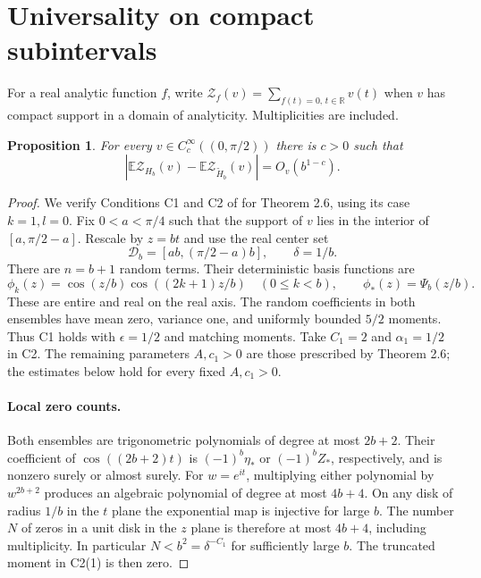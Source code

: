 \documentclass[11pt]{article}
\newtheorem{proposition}[theorem]{Proposition}
\newcommand{\E}{\mathbb E}
\newcommand{\R}{\mathbb R}
\begin{document}
\section{Universality on compact subintervals}
For a real analytic function $f$, write
$\mathcal Z_f(v)=\sum_{f(t)=0,\,t\in\R}v(t)$ when $v$ has compact
support in a domain of analyticity. Multiplicities are included.

\begin{proposition}\label{prop:universality}
For every $v\in C_c^\infty((0,\pi/2))$ there is $c>0$ such that
\begin{equation}\label{eq:univ}
 \left|\E\mathcal Z_{H_b}(v)-\E\mathcal Z_{\widetilde H_b}(v)\right|
 =O_v(b^{1-c}).
\end{equation}
\end{proposition}
\begin{proof}
We verify Conditions C1 and C2 of \cite{NV} for Theorem 2.6, using its
case $k=1,l=0$. Fix $0<a<\pi/4$ such that the support of $v$ lies in
the interior of $[a,\pi/2-a]$. Rescale by $z=bt$ and use the real
center set
\[
 \mathcal D_b=[ab,(\pi/2-a)b],\qquad \delta=1/b.
\]
There are $n=b+1$ random terms. Their deterministic basis functions are
\[
 \phi_k(z)=\cos(z/b)\cos((2k+1)z/b)\quad(0\le k<b),
 \qquad \phi_*(z)=\Psi_b(z/b).
\]
These are entire and real on the real axis. The random coefficients in
both ensembles have mean zero, variance one, and uniformly bounded
$5/2$ moments. Thus C1 holds with $\epsilon=1/2$ and matching moments.
Take $C_1=2$ and $\alpha_1=1/2$ in C2. The remaining parameters
$A,c_1>0$ are those prescribed by Theorem 2.6; the estimates below hold
for every fixed $A,c_1>0$.

\paragraph{Local zero counts.}
Both ensembles are trigonometric polynomials of degree at most $2b+2$.
Their coefficient of $\cos((2b+2)t)$ is $(-1)^b\eta_*$ or $(-1)^bZ_*$,
respectively, and is nonzero surely or almost surely.
For $w=e^{it}$, multiplying either polynomial by $w^{2b+2}$ produces
an algebraic polynomial of degree at most $4b+4$.
On any disk of radius $1/b$ in the $t$ plane the exponential map is
injective for large $b$. The number $N$ of zeros in a unit disk in the
$z$ plane is therefore at most $4b+4$, including multiplicity.
In particular $N<b^2=\delta^{-C_1}$ for sufficiently large $b$.
The truncated moment in C2(1) is then zero.


\end{proof}
\end{document}
